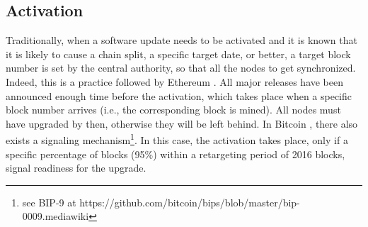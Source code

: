 \subsection{Activation}
Traditionally, when a software update needs to be activated and it is known that it is likely to cause a chain split, a specific target date, or better, a target block number is set by the central authority, so that all the nodes to get synchronized. Indeed, this is a practice followed by Ethereum \cite{ethereum}. All major releases have been announced enough time before the activation, which takes place when a specific block number arrives (i.e., the corresponding block is mined). All nodes must have upgraded by then, otherwise they will be left behind. In Bitcoin \cite{bitcoin}, there also exists a signaling mechanism\footnote{see BIP-9 at https://github.com/bitcoin/bips/blob/master/bip-0009.mediawiki}. In this case, the activation takes place, only if a specific percentage of blocks (95\%) within a retargeting period of 2016 blocks, signal readiness for the upgrade. 
